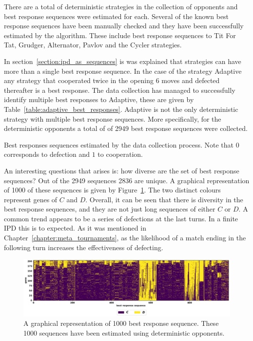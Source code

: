 There are a total of \deterministicstrategies deterministic strategies in the
collection of opponents and best response sequences were estimated for each.
Several of the known best response sequences have been manually checked and they
have been successfully estimated by the algorithm. These include best response
sequences to Tit For Tat, Grudger, Alternator, Pavlov and the Cycler strategies.

In section~\ref{section:ipd_as_sequences} is was explained that strategies can
have more than a single best response sequence. In the case of the strategy
Adaptive any strategy that cooperated twice in the opening 6 moves and defected
thereafter is a best response. The data collection has managed to successfully identify
multiple best responses to Adaptive, these are given by
Table~\ref{table:adaptive_best_responses}. Adaptive is not the only
deterministic strategy with multiple best response sequences. More specifically,
for the \deterministicstrategies deterministic opponents a total of of 2949 best
response sequences were collected.

\begin{table}[!htbp]
    \resizebox{\textwidth}{!}{
    }
    \caption{Best responses sequences estimated by the data collection process.
    Note that \(0\) corresponds to defection and \(1\) to cooperation.}
    \label{table:adaptive_best_responses}
\end{table}

An interesting questions that arises is: how diverse are the set of best response
sequences? Out of the 2949 sequences 2836 are unique. A graphical
representation of 1000 of these sequences is given by Figure~\ref{fig:brs_visualisation}.
The two distinct colours represent genes of \(C\) and \(D\). Overall, it can be
seen that there is diversity in the best response sequences, and they are not just
long sequences of either \(C\) or \(D\). A common trend appears to be a series
of defections at the last turns. In a finite IPD this is to expected. As it was
mentioned in Chapter~\ref{chapter:meta_tournaments}, as the likelihood of a
match ending in the following turn increases the effectiveness of defecting.

\begin{figure}[!htbp]
    \centering
    \includegraphics[width=\textwidth]{src/chapters/06/img/deterministic_best_responses.pdf}
    \caption{A graphical representation of 1000 best response sequence. These
    1000 sequences have been estimated using deterministic opponents.}\label{fig:brs_visualisation}
\end{figure}

